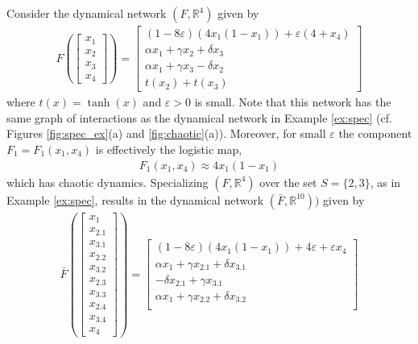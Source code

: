 \documentclass[12pt]{thesis}
\begin{document}
\begin{example}\label{ex:chaotic-ex}
Consider the dynamical network $(F,\mathbb{R}^4)$ given by
\begin{align*}
    F\left(\begin{bmatrix}x_1 \\ x_2 \\ x_3 \\ x_4\end{bmatrix}\right) = \begin{bmatrix}(1-8\varepsilon)(4 x_1 (1 - x_1)) + \varepsilon(4+x_4)\\
  \alpha x_1 + \gamma x_2 + \delta x_3 \\
  \alpha x_1 + \gamma x_3 - \delta x_2 \\ t(x_2) + t(x_3)\end{bmatrix}
\end{align*}
where $t(x)=\tanh(x)$ and $\varepsilon>0$ is small.
Note that this network has the same graph of interactions as the dynamical network in Example \ref{ex:spec} (cf. Figures \ref{fig:spec_ex}(a) and \ref{fig:chaotic}(a)). Moreover, for small $\varepsilon$ the component $F_1=F_1(x_1,x_4)$ is effectively the logistic map,
\begin{align*}
F_1(x_1,x_4)\approx 4x_1(1-x_1)
\end{align*}
which has chaotic dynamics.
Specializing $(F,\mathbb{R}^4)$ over the set $S=\{2,3\}$, as in Example \ref{ex:spec}, results in the dynamical network $(\bar{F},\mathbb{R}^{10}))$ given by
\begin{align*}
    \bar{F}\left(\begin{bmatrix}x_1 \\ x_{2.1} \\ x_{3.1} \\ x_{2.2} \\ x_{3.2} \\ x_{2.3} \\ x_{3.3} \\ x_{2.4} \\ x_{3.4} \\ x_4\end{bmatrix}\right)
    =
    \begin{bmatrix}
        (1-8\varepsilon)(4 x_1 (1 - x_1)) + 4\varepsilon + \varepsilon x_4 \\
        \alpha x_1 + \gamma x_{2.1} + \delta x_{3.1} \\
        -\delta x_{2.1} + \gamma x_{3.1} \\
        \alpha x_1 + \gamma x_{2.2} + \delta x_{3.2} \\

\end{bmatrix}
\end{align*}
\end{example}
\end{document}
